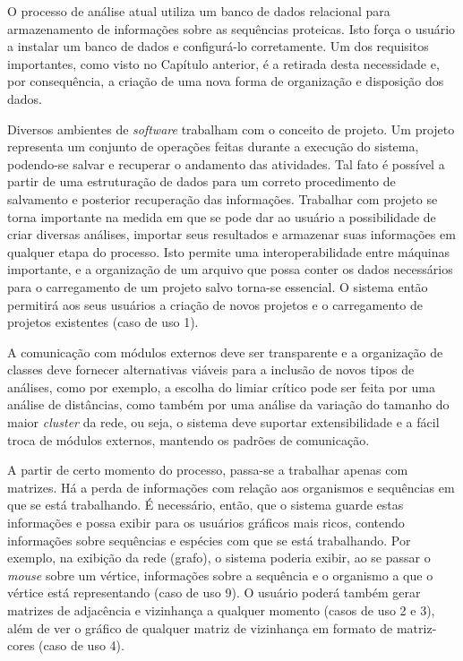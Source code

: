O processo de análise atual utiliza um banco de dados relacional para armazenamento de informações
sobre as sequências proteicas. Isto força o usuário a instalar
um banco de dados e configurá-lo corretamente. Um dos requisitos importantes, como visto no Capítulo anterior, é a retirada desta necessidade e,
por consequência, a criação de uma nova forma de organização e disposição dos dados.

Diversos ambientes de \textit{software} trabalham com o conceito de projeto. Um projeto
representa um conjunto de operações feitas durante a execução do sistema,
podendo-se salvar e recuperar o andamento das atividades. Tal fato é possível a partir de uma estruturação de dados para um correto procedimento de
salvamento e posterior recuperação das informações. Trabalhar com projeto se torna importante na medida em que se pode
dar ao usuário a possibilidade de criar
diversas análises, importar seus resultados e armazenar suas informações em qualquer etapa do processo.
Isto permite uma interoperabilidade entre máquinas importante, e a organização de um arquivo
que possa conter os dados necessários para o carregamento de um projeto salvo torna-se essencial. O sistema então permitirá aos seus usuários a criação de
novos projetos e o carregamento de projetos existentes (caso de uso 1).

A comunicação com módulos externos deve ser transparente e a organização de classes deve fornecer alternativas viáveis para a inclusão de novos
tipos de análises, como por exemplo, a escolha do limiar crítico pode ser feita por uma análise de distâncias, como também por uma análise da variação
do tamanho
do maior \textit{cluster} da rede, ou seja, o sistema deve suportar extensibilidade e a fácil troca de módulos externos, mantendo
os padrões de comunicação.

A partir de certo momento do processo, passa-se a trabalhar apenas com matrizes. Há a perda de informações com relação aos organismos e sequências em que
se está trabalhando. É necessário, então, que o sistema guarde estas informações e possa exibir para os usuários gráficos mais ricos, contendo informações
sobre sequências e espécies com que se está trabalhando. Por exemplo, na exibição da rede (grafo), o sistema poderia exibir, ao se passar o \textit{mouse}
sobre um vértice,
informações sobre a sequência e o organismo a que o vértice está representando (caso de uso 9). O usuário poderá também gerar matrizes de adjacência e
vizinhança a qualquer momento (casos de uso 2 e 3), além de ver o gráfico de qualquer matriz de vizinhança em formato de \gls{matriz-cores} (caso de uso 4).

